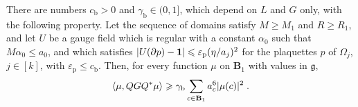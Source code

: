 \documentclass[11pt]{preprint}
\newcommand{\id}{\mathbf 1}
\DeclarePairedDelimiter{\abs}{\lvert}{\rvert}
\numberwithin{equation}{section}
\begin{document}
\begin{proposition}\label{prop:block-form}
There are numbers $c_{\mathrm b} > 0$ and $\gamma_{\mathrm b} \in (0, 1]$, which depend on $L$ and $G$ only, with the following property. Let the sequence of domains satisfy $M \geqslant M_1$ and $R \geqslant R_1$, and let $U$ be a gauge field which is regular with a constant $\alpha_0$ such that $M\alpha_0 \leqslant a_0$, and which satisfies $\abs{U(\partial p) - \id} \leqslant \varepsilon_{\mathrm p}(\eta/a_j)^2$ for the plaquettes $p$ of $\Omega_j$, $j \in [k]$, with $\varepsilon_{\mathrm p} \leqslant c_{\mathrm b}$. Then, for every function $\mu$ on $\mathbf B_1$ with values in $\mathfrak g$,
\begin{equation}\label{eq:block-form-lower}
    \langle\mu, QGQ^*\mu\rangle \geqslant \gamma_{\mathrm b}\sum_{c \in \mathbf B_1}a_c^6\abs{\mu(c)}^2\;.
\end{equation}
\end{proposition}
\end{document}
